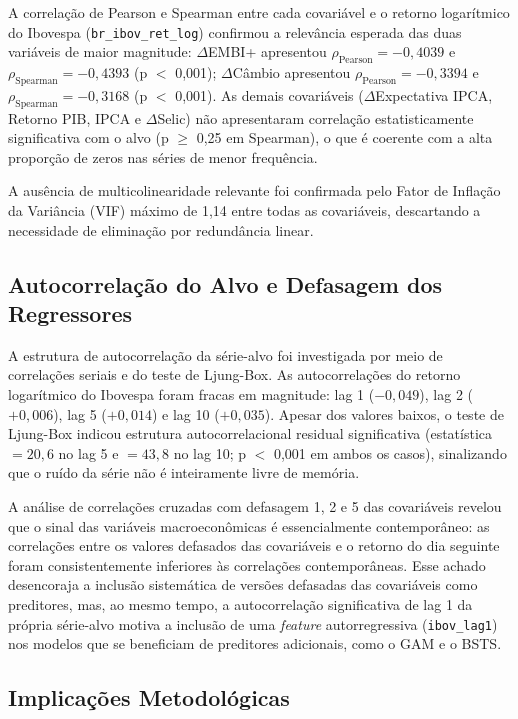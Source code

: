\documentclass[	12pt, Times, openright, oneside, a4paper, english, brazil]{abntex2}
\begin{document}
A correlação de Pearson e Spearman entre cada covariável e o retorno logarítmico do Ibovespa (\texttt{br\_ibov\_ret\_log}) confirmou a relevância esperada das duas variáveis de maior magnitude: $\Delta$EMBI+ apresentou $\rho_{\text{Pearson}} = -0{,}4039$ e $\rho_{\text{Spearman}} = -0{,}4393$ (p $<$ 0,001); $\Delta$Câmbio apresentou $\rho_{\text{Pearson}} = -0{,}3394$ e $\rho_{\text{Spearman}} = -0{,}3168$ (p $<$ 0,001). As demais covariáveis ($\Delta$Expectativa IPCA, Retorno PIB, IPCA e $\Delta$Selic) não apresentaram correlação estatisticamente significativa com o alvo (p $\geq$ 0,25 em Spearman), o que é coerente com a alta proporção de zeros nas séries de menor frequência.

A ausência de multicolinearidade relevante foi confirmada pelo Fator de Inflação da Variância (VIF) máximo de 1,14 entre todas as covariáveis, descartando a necessidade de eliminação por redundância linear.

\subsection{Autocorrelação do Alvo e Defasagem dos Regressores}

A estrutura de autocorrelação da série-alvo foi investigada por meio de correlações seriais e do teste de Ljung-Box. As autocorrelações do retorno logarítmico do Ibovespa foram fracas em magnitude: lag 1 ($-0{,}049$), lag 2 ($+0{,}006$), lag 5 ($+0{,}014$) e lag 10 ($+0{,}035$). Apesar dos valores baixos, o teste de Ljung-Box indicou estrutura autocorrelacional residual significativa (estatística $= 20{,}6$ no lag 5 e $= 43{,}8$ no lag 10; p $<$ 0,001 em ambos os casos), sinalizando que o ruído da série não é inteiramente livre de memória.

A análise de correlações cruzadas com defasagem 1, 2 e 5 das covariáveis revelou que o sinal das variáveis macroeconômicas é essencialmente contemporâneo: as correlações entre os valores defasados das covariáveis e o retorno do dia seguinte foram consistentemente inferiores às correlações contemporâneas. Esse achado desencoraja a inclusão sistemática de versões defasadas das covariáveis como preditores, mas, ao mesmo tempo, a autocorrelação significativa de lag 1 da própria série-alvo motiva a inclusão de uma \textit{feature} autorregressiva (\texttt{ibov\_lag1}) nos modelos que se beneficiam de preditores adicionais, como o GAM e o BSTS.

\subsection{Implicações Metodológicas}
\end{document}
